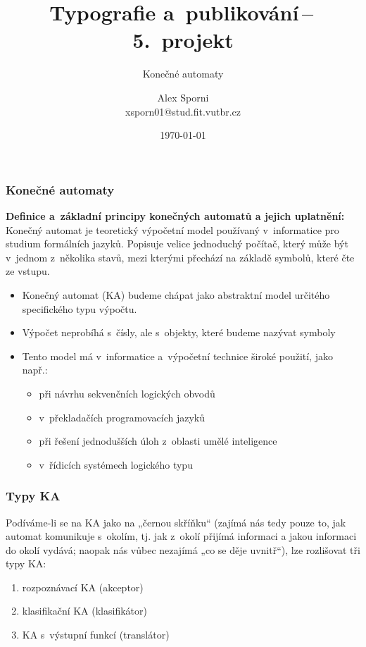\documentclass[hyperref={unicode}]{beamer}
\title{Typografie a~publikování\,--\,5.~projekt}
\subtitle{Konečné automaty}
\author{Alex Sporni\texorpdfstring{\\ xsporn01@stud.fit.vutbr.cz}{}}
\date{\today}
\institute
{
	Vysoké učení technické v~Brně\\
	Fakulta informačních technologií
}
\begin{document}
\begin{frame}
\titlepage
\end{frame}
\begin{frame}
\transblindshorizontal
\frametitle{Konečné automaty}
\textbf{Definice a~základní principy konečných automatů a jejich uplatnění:}\\
Konečný automat je teoretický výpočetní model používaný v~informatice pro studium formálních jazyků. Popisuje velice jednoduchý počítač, který může být v~jednom z~několika stavů, mezi kterými přechází na základě symbolů, které čte ze vstupu.
\begin{itemize}
\pause
\item{Konečný automat (KA) budeme chápat jako abstraktní model určitého specifického typu výpočtu.}
\pause
\item{Výpočet neprobíhá s~čísly, ale s~objekty, které budeme nazývat symboly}
\pause
\item{Tento model má v~informatice a~výpočetní technice široké použití, jako např.:}
\pause
\begin{itemize}
\item{při návrhu sekvenčních logických obvodů}
\item{v~překladačích programovacích jazyků}
\item{při řešení jednodušších úloh z~oblasti umělé inteligence}
\item{v~řídicích systémech logického typu}
\end{itemize}
\end{itemize}
\end{frame}
\begin{frame}
\transblindshorizontal
\frametitle{Typy KA}
Podíváme-li se na KA jako na „černou skříňku“ (zajímá nás tedy pouze to, jak automat komunikuje s~okolím, tj. jak z~okolí přijímá informaci a jakou informaci do okolí vydává; naopak nás vůbec nezajímá „co se děje uvnitř“), lze rozlišovat tři typy KA:
\begin{enumerate}
\item{rozpoznávací KA (akceptor)}
\item{klasifikační KA (klasifikátor)}
\item{KA s~výstupní funkcí (translátor)}
\end{enumerate}
\end{frame}
\end{document}
